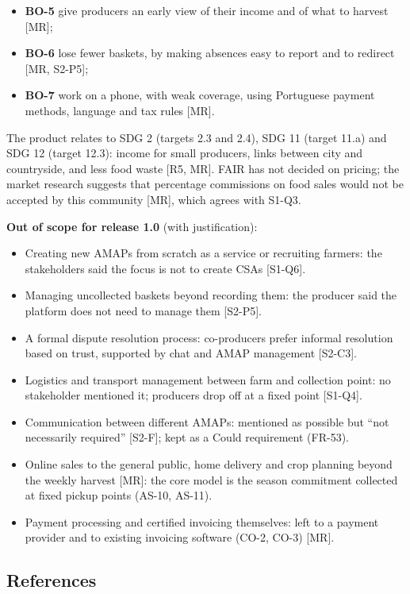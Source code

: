 \documentclass[11pt,a4paper]{article}
\begin{document}
\begin{itemize}
  \item \textbf{BO-5} give producers an early view of their income and of what to harvest [MR];
  \item \textbf{BO-6} lose fewer baskets, by making absences easy to report and to redirect [MR, S2-P5];
  \item \textbf{BO-7} work on a phone, with weak coverage, using Portuguese payment methods, language and tax rules [MR].
\end{itemize}
The product relates to SDG 2 (targets 2.3 and 2.4), SDG 11 (target 11.a) and SDG 12 (target 12.3): income for small producers, links between city and countryside, and less food waste [R5, MR]. FAIR has not decided on pricing; the market research suggests that percentage commissions on food sales would not be accepted by this community [MR], which agrees with S1-Q3.

\textbf{Out of scope for release 1.0} (with justification):

\begin{itemize}
  \item Creating new AMAPs from scratch as a service or recruiting farmers: the stakeholders said the focus is not to create CSAs [S1-Q6].
  \item Managing uncollected baskets beyond recording them: the producer said the platform does not need to manage them [S2-P5].
  \item A formal dispute resolution process: co-producers prefer informal resolution based on trust, supported by chat and AMAP management [S2-C3].
  \item Logistics and transport management between farm and collection point: no stakeholder mentioned it; producers drop off at a fixed point [S1-Q4].
  \item Communication between different AMAPs: mentioned as possible but ``not necessarily required'' [S2-F]; kept as a Could requirement (FR-53).
  \item Online sales to the general public, home delivery and crop planning beyond the weekly harvest [MR]: the core model is the season commitment collected at fixed pickup points (AS-10, AS-11).
  \item Payment processing and certified invoicing themselves: left to a payment provider and to existing invoicing software (CO-2, CO-3) [MR].
\end{itemize}

\subsection{References}
\end{document}
